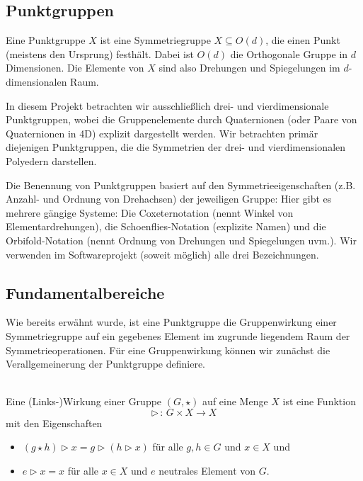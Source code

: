 \subsection{Punktgruppen}
Eine Punktgruppe $X$ ist eine Symmetriegruppe $X \subseteq O(d)$, die einen Punkt (meistens den Ursprung) festhält.
Dabei ist $O(d)$ die Orthogonale Gruppe in $d$ Dimensionen. Die Elemente von $X$ sind also Drehungen und Spiegelungen im $d$-dimensionalen
Raum.

\noindent In diesem Projekt betrachten wir ausschließlich drei- und vierdimensionale Punktgruppen, wobei die Gruppenelemente
durch Quaternionen (oder Paare von Quaternionen in 4D) explizit dargestellt werden.
Wir betrachten primär diejenigen Punktgruppen, die die Symmetrien der drei- und vierdimensionalen Polyedern darstellen.

\noindent Die Benennung von Punktgruppen basiert auf den Symmetrieeigenschaften (z.B. Anzahl- und Ordnung von Drehachsen) der jeweiligen Gruppe:
Hier gibt es mehrere gängige Systeme: Die Coxeternotation (nennt Winkel von Elementardrehungen), die Schoenflies-Notation (explizite Namen) und die
Orbifold-Notation (nennt Ordnung von Drehungen und Spiegelungen uvm.). Wir verwenden im Softwareprojekt (soweit möglich) alle drei Bezeichnungen.

\subsection{Fundamentalbereiche}\label{fundamentalbereich}

Wie bereits erwähnt wurde, ist eine Punktgruppe die Gruppenwirkung einer Symmetriegruppe auf ein gegebenes Element im zugrunde liegendem Raum der Symmetrieoperationen.
Für eine Gruppenwirkung können wir zunächst die Verallgemeinerung der Punktgruppe definiere.

\begin{definition}[Gruppenwirkung]\label{fundamentalbereich:wirking} \mbox{}\\
 Eine (Links-)Wirkung einer Gruppe $(G, \star)$ auf eine Menge $X$ ist eine Funktion
   $$
      \rhd \, : \, G \times X \longrightarrow X
   $$
   mit den Eigenschaften
   \begin{itemize}
      \item $(g \star h) \rhd x = g \rhd (h \rhd x)$ für alle $g,h \in G$ und $x \in X$ und
      \item $e \rhd x = x$ für alle $x \in X$ und $e$ neutrales Element von $G$.
   \end{itemize}
\end{definition}

